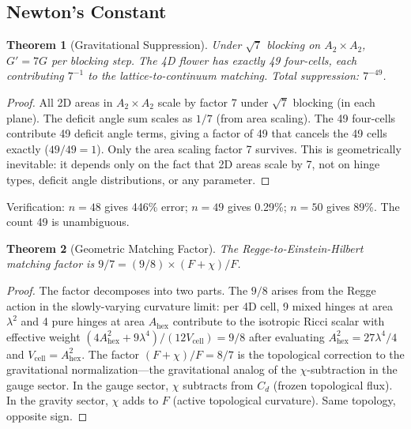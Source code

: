 \documentclass[12pt,a4paper]{article}
\theoremstyle{plain}
\newtheorem{theorem}{Theorem}[section]
\theoremstyle{definition}
\begin{document}
\subsection{Newton's Constant}

\begin{theorem}[Gravitational Suppression]\label{thm:grav-suppress}
Under $\sqrt{7}$ blocking on $A_2 \times A_2$, $G' = 7G$ per blocking step. The 4D flower has exactly 49 four-cells, each contributing $7^{-1}$ to the lattice-to-continuum matching. Total suppression: $7^{-49}$.
\end{theorem}

\begin{proof}
All 2D areas in $A_2 \times A_2$ scale by factor 7 under $\sqrt{7}$ blocking (in each plane). The deficit angle sum scales as $1/7$ (from area scaling). The 49 four-cells contribute 49 deficit angle terms, giving a factor of 49 that cancels the 49 cells exactly ($49/49 = 1$). Only the area scaling factor 7 survives. This is geometrically inevitable: it depends only on the fact that 2D areas scale by 7, not on hinge types, deficit angle distributions, or any parameter. \qedhere
\end{proof}

Verification: $n = 48$ gives 446\% error; $n = 49$ gives 0.29\%; $n = 50$ gives 89\%. The count 49 is unambiguous.

\begin{theorem}[Geometric Matching Factor]\label{thm:nine-seven}
The Regge-to-Einstein-Hilbert matching factor is $9/7 = (9/8) \times (F + \chi)/F$.
\end{theorem}

\begin{proof}
The factor decomposes into two parts. The $9/8$ arises from the Regge action in the slowly-varying curvature limit: per 4D cell, 9 mixed hinges at area $\lambda^2$ and 4 pure hinges at area $A_{\mathrm{hex}}$ contribute to the isotropic Ricci scalar with effective weight $(4 A_{\mathrm{hex}}^2 + 9\lambda^4)/(12 V_{\mathrm{cell}}) = 9/8$ after evaluating $A_{\mathrm{hex}}^2 = 27\lambda^4/4$ and $V_{\mathrm{cell}} = A_{\mathrm{hex}}^2$. The factor $(F + \chi)/F = 8/7$ is the topological correction to the gravitational normalization---the gravitational analog of the $\chi$-subtraction in the gauge sector. In the gauge sector, $\chi$ subtracts from $C_d$ (frozen topological flux). In the gravity sector, $\chi$ adds to $F$ (active topological curvature). Same topology, opposite sign. \qedhere
\end{proof}
\end{document}
